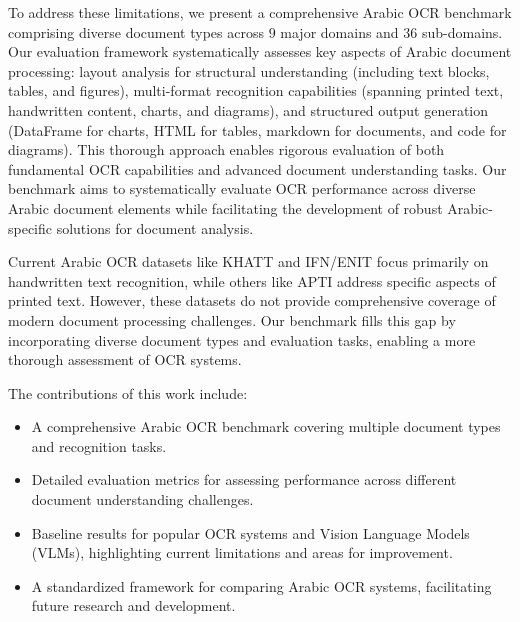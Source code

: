 To address these limitations, we present a comprehensive Arabic OCR benchmark comprising diverse document types across $9$ major domains and $36$ sub-domains. Our evaluation framework systematically assesses key aspects of Arabic document processing: layout analysis for structural understanding (including text blocks, tables, and figures), multi-format recognition capabilities (spanning printed text, handwritten content, charts, and diagrams), and structured output generation (DataFrame for charts, HTML for tables, markdown for documents, and code for diagrams). This thorough approach enables rigorous evaluation of both fundamental OCR capabilities and advanced document understanding tasks.
Our benchmark aims to systematically evaluate OCR performance across diverse Arabic document elements while facilitating the development of robust Arabic-specific solutions for document analysis.


\noindent Current Arabic OCR datasets like KHATT \cite{mahmoud2014khatt} and IFN/ENIT \cite{pechwitz2002ifn} focus primarily on handwritten text recognition, while others like APTI \cite{slimane2009new} address specific aspects of printed text. However, these datasets do not provide comprehensive coverage of modern document processing challenges. Our benchmark fills this gap by incorporating diverse document types and evaluation tasks, enabling a more thorough assessment of OCR systems.

The contributions of this work include:
\begin{itemize}
    \item A comprehensive Arabic OCR benchmark covering multiple document types and recognition tasks.
    \item Detailed evaluation metrics for assessing performance across different document understanding challenges. 
    \item Baseline results for popular OCR systems and Vision Language Models (VLMs), highlighting current limitations and areas for improvement.
    \item A standardized framework for comparing Arabic OCR systems, facilitating future research and development.
\end{itemize}
